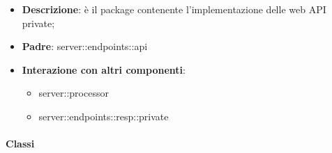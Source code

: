 \begin{itemize}
  \item \textbf{Descrizione}: è il package contenente l'implementazione delle web API private;
  \item \textbf{Padre}: server::endpoints::api
  \item \textbf{Interazione con altri componenti}:
  	\begin{itemize}
        \item server::processor
				\item server::endpoints::resp::private
    \end{itemize}
\end{itemize}

	\paragraph{Classi} %


